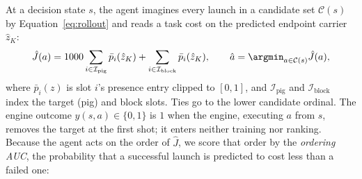 At a decision state $s$, the agent imagines every launch in a candidate set $\mathcal{C}(s)$ by Equation~\ref{eq:rollout} and reads a task cost on the predicted endpoint carrier $\hat z_K$:
\begin{equation}
\hat J(a)=1000\sum_{i\in\mathcal{I}_{\mathrm{pig}}}\bar p_i(\hat z_K)+\sum_{i\in\mathcal{I}_{\mathrm{block}}}\bar p_i(\hat z_K),\qquad
\hat a=\argmin_{a\in\mathcal{C}(s)}\hat J(a),
\label{eq:select}
\end{equation}
where $\bar p_i(z)$ is slot $i$'s presence entry clipped to $[0,1]$, and $\mathcal{I}_{\mathrm{pig}}$ and $\mathcal{I}_{\mathrm{block}}$ index the target (pig) and block slots. Ties go to the lower candidate ordinal. The engine outcome $y(s,a)\in\{0,1\}$ is $1$ when the engine, executing $a$ from $s$, removes the target at the first shot; it enters neither training nor ranking. Because the agent acts on the order of $\hat J$, we score that order by the \emph{ordering AUC}, the probability that a successful launch is predicted to cost less than a failed one:
